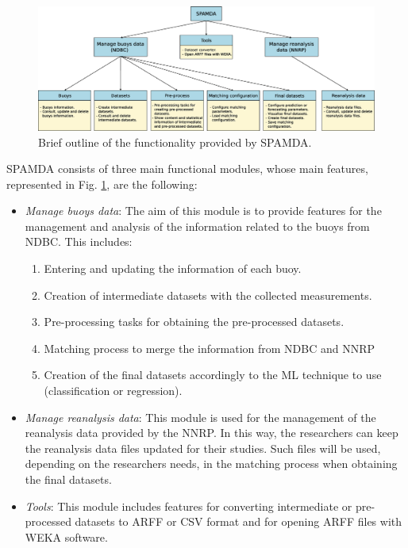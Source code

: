 \documentclass[energies,article,submit,moreauthors,pdftex]{Definitions/mdpi}
\begin{document}
		\begin{figure}[ht!]
			\centering
			\includegraphics[scale=0.32]{figures/FigureSPAMDA.eps}
			\caption{Brief outline of the functionality provided by SPAMDA.}
			\label{fig:SPAMDA}
		\end{figure}
		SPAMDA consists of three main functional modules, whose main features, represented in Fig. \ref{fig:SPAMDA}, are the following:
		\begin{itemize}
			
			
			\item \textit{Manage buoys data}: The aim of this module is to provide features for the management and analysis of the information related to the buoys from NDBC. This includes:
			\begin{enumerate}
				\item Entering and updating the information of each buoy.
				\item Creation of intermediate datasets with the collected measurements.
				\item Pre-processing tasks for obtaining the pre-processed datasets.
				\item Matching process to merge the information from NDBC and NNRP
				\item Creation of the final datasets accordingly to the ML technique to use (classification or regression).
			\end{enumerate}
			
			\item \textit{Manage reanalysis data}: This module is used for the management of the reanalysis data provided by the NNRP. In this way, the researchers can keep the reanalysis data files updated for their studies. Such files will be used, depending on the researchers needs, in the matching process when obtaining the final datasets.
			
			\item \textit{Tools}: This module includes features for converting intermediate or pre-processed datasets to ARFF or CSV format and for opening ARFF files with WEKA software.
			
		\end{itemize}
\end{document}
